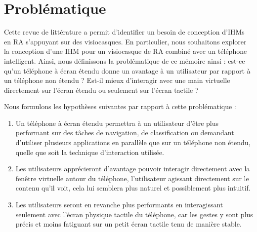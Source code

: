 


\section{Problématique}
\label{sec:research_problem}

Cette revue de littérature a permit d'identifier un besoin de conception d'IHMs en RA s'appuyant sur des visiocasques. En particulier, nous souhaitons explorer la conception d'une IHM pour un visiocasque de RA combiné avec un téléphone intelligent. Ainsi, nous définissons la problématique de ce mémoire ainsi : est-ce qu'un téléphone à écran étendu donne un avantage à un utilisateur par rapport à un téléphone non étendu ? Est-il mieux d'interagir avec une main virtuelle directement sur l'écran étendu ou seulement sur l'écran tactile ?

Nous formulons les hypothèses suivantes par rapport à cette problématique :
\begin{enumerate}[label={(H\arabic*)}]
  \item Un téléphone à écran étendu permettra à un utilisateur d'être plus performant sur des tâches de navigation, de classification ou demandant d'utiliser plusieurs applications en parallèle que sur un téléphone non étendu, quelle que soit la technique d'interaction utilisée.
  \item Les utilisateurs apprécieront d'avantage pouvoir interagir directement avec la fenêtre virtuelle autour du téléphone, l'utilisateur agissant directement sur le contenu qu'il voit, cela lui semblera plus naturel et possiblement plus intuitif.
  \item Les utilisateurs seront en revanche plus performants en interagissant seulement avec l'écran physique tactile du téléphone, car les gestes y sont plus précis et moins fatiguant sur un petit écran tactile tenu de manière stable.
\end{enumerate}

